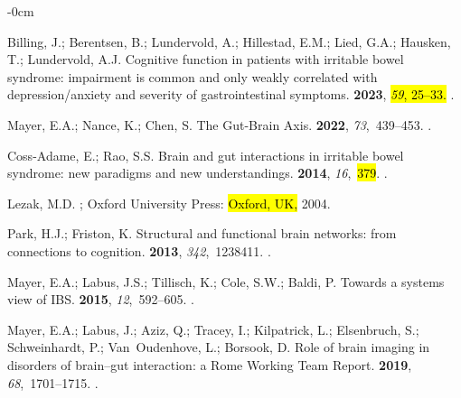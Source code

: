 \documentclass[diagnostics,article,accept,pdftex,moreauthors]{Definitions/mdpi}
\begin{document}
\begin{adjustwidth}{-\extralength}{0cm}
\begin{thebibliography}{999}
Billing, J.; Berentsen, B.; Lundervold, A.; Hillestad, E.M.; Lied, G.A.;
  Hausken, T.; Lundervold, A.J.
\newblock Cognitive function in patients with irritable bowel syndrome:
  impairment is common and only weakly correlated with depression/anxiety and
  severity of gastrointestinal symptoms.
 {\bf 2023}, \hl{\emph{59}, 25--33.} %
.


Mayer, E.A.; Nance, K.; Chen, S.
\newblock The Gut-Brain Axis.
 {\bf 2022}, {\em 73},~439--453.
.

Coss-Adame, E.; Rao, S.S.
\newblock Brain and gut interactions in irritable bowel syndrome: new paradigms
  and new understandings.
 {\bf 2014}, {\em 16},~\hl{379}.
.

Lezak, M.D.
; Oxford University Press: \hl{Oxford, UK,} %
  2004.

Park, H.J.; Friston, K.
\newblock Structural and functional brain networks: from connections to
  cognition.
 {\bf 2013}, {\em 342},~1238411.
.

Mayer, E.A.; Labus, J.S.; Tillisch, K.; Cole, S.W.; Baldi, P.
\newblock Towards a systems view of IBS.
 {\bf 2015}, {\em
  12},~592--605.
.

Mayer, E.A.; Labus, J.; Aziz, Q.; Tracey, I.; Kilpatrick, L.; Elsenbruch, S.;
  Schweinhardt, P.; Van~Oudenhove, L.; Borsook, D.
\newblock Role of brain imaging in disorders of brain--gut interaction: a Rome
  Working Team Report.
 {\bf 2019}, {\em 68},~1701--1715.
.


\end{thebibliography}
\end{adjustwidth}
\end{document}
